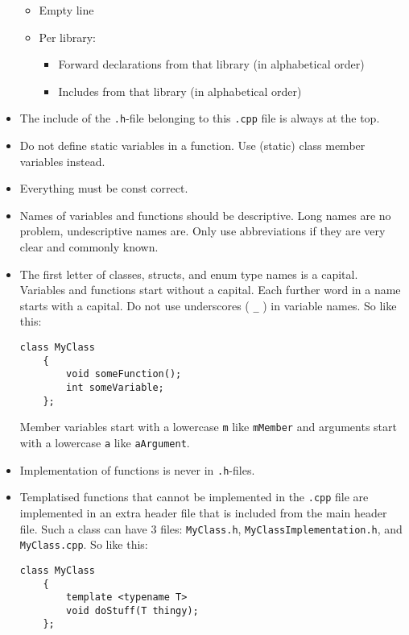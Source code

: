 \documentclass{article}
\begin{document}
\begin{itemize}
\begin{itemize}
        \item Empty line
        \item Per library:
        \begin{itemize}
            \item Forward declarations from that library (in alphabetical order)
            \item Includes from that library (in alphabetical order)
        \end{itemize}
    \end{itemize}
    \item The include of the \texttt{.h}-file belonging to this \texttt{.cpp} file is always at the top.
    \item Do not define static variables in a function. Use (static) class member variables instead.
    \item Everything must be const correct.
    \item Names of variables and functions should be descriptive. Long names are no problem, undescriptive names are. Only use abbreviations if they are very clear and commonly known.
    \item The first letter of classes, structs, and enum type names is a capital. Variables and functions start without a capital. Each further word in a name starts with a capital. Do not use underscores ( \texttt{\_} ) in variable names. So like this:
    \begin{Verbatim}[fontsize=\small]
    class MyClass
    {
        void someFunction();
        int someVariable;
    };
    \end{Verbatim}
    Member variables start with a lowercase \texttt{m} like \texttt{mMember} and arguments start with a lowercase \texttt{a} like \texttt{aArgument}.
    \item Implementation of functions is never in \texttt{.h}-files.
    \item Templatised functions that cannot be implemented in the \texttt{.cpp} file are implemented in an extra header file that is included from the main header file. Such a class can have 3 files: \texttt{MyClass.h}, \texttt{MyClassImplementation.h}, and \texttt{MyClass.cpp}. So like this:
    \begin{Verbatim}[fontsize=\small]
    class MyClass
    {
        template <typename T>
        void doStuff(T thingy);
    };


\end{Verbatim}
\end{itemize}
\end{document}
